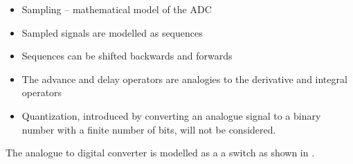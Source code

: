 \begin{slide}\label{slide:l7s2a}
  \begin{itemize}
   \item Sampling -- mathematical model of the ADC
   \item Sampled signals are modelled as sequences
   \item Sequences can be shifted backwards and forwards
   \item The advance and delay operators are analogies to the derivative
     and integral operators
  \end{itemize}
\end{slide}

\begin{slide}\label{slide:l7s2}
  \begin{itemize}
   \item Quantization, introduced by converting an analogue signal to a
     binary number with a finite number of bits, will not be considered. 
  \end{itemize}
\end{slide}


The analogue to digital converter is modelled as a a switch as
shown in . 

\ifslidesonly
\begin{slide}

\end{slide}
\fi


\ifslidesonly
\begin{slide}

\end{slide}
\fi


\begin{slide}\label{slide:l7s3}
\end{slide}

